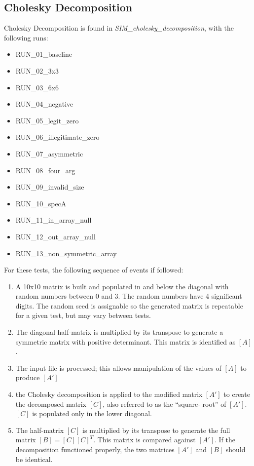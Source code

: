 \documentclass[11pt,fleqn]{report}
\begin{document}
\subsection{Cholesky Decomposition}

Cholesky Decomposition is found in
\textit{SIM\_cholesky\_decomposition}, with the following runs:
\begin{itemize}
 \item RUN\_01\_baseline
 \item RUN\_02\_3x3
 \item RUN\_03\_6x6
 \item RUN\_04\_negative
 \item RUN\_05\_legit\_zero
 \item RUN\_06\_illegitimate\_zero
 \item RUN\_07\_asymmetric
 \item RUN\_08\_four\_arg
 \item RUN\_09\_invalid\_size
 \item RUN\_10\_specA
 \item RUN\_11\_in\_array\_null
 \item RUN\_12\_out\_array\_null
 \item RUN\_13\_non\_symmetric\_array
\end{itemize}
For these tests, the following sequence of events if followed:
\begin{enumerate}
\item A 10x10 matrix is built and populated in and below the diagonal with
random numbers between 0 and 3. The random numbers have 4 significant
digits. The random seed is assignable so the generated matrix is
repeatable for a given test, but may vary between tests.
\item The diagonal half-matrix is multiplied by its transpose to generate a
symmetric matrix with positive determinant.
This matrix is identified as $[A]$.
\item The input file is processed; this allows manipulation of the values
of $[A]$ to produce $[A']$
\item the Cholesky decomposition is applied to the modified matrix $[A']$ to
create the decomposed matrix $[C]$, also referred to as the ``square-
root'' of $[A']$. $[C]$ is populated only in the lower diagonal.
\item The half-matrix $[C]$ is multiplied by its transpose to generate the
full matrix $[B] = [C][C]^T$. This matrix is compared against
$[A']$. If the
decomposition functioned properly, the two matrices $[A']$ and $[B]$
should be identical.
\end{enumerate}
\end{document}
